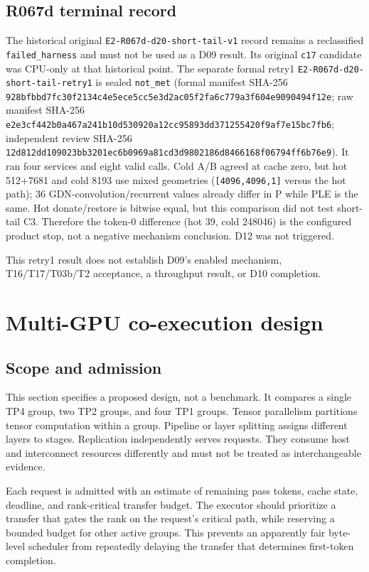 \documentclass[11pt]{article}
\begin{document}
\subsection{R067d terminal record}
\label{sec:r067d}

The historical original \texttt{E2-R067d-d20-short-tail-v1} record remains a reclassified \texttt{failed\_harness} and must not be used as a D09 result. Its original \texttt{c17} candidate was CPU-only at that historical point. The separate formal retry1 \texttt{E2-R067d-d20-short-tail-retry1} is sealed \texttt{not\_met} (formal manifest SHA-256 \texttt{928bfbbd7fc30f2134c4e5ece5cc5e3d2ac05f2fa6c779a3f604e9090494f12e}; raw manifest SHA-256 \texttt{e2e3cf442b0a467a241b10d530920a12cc95893dd371255420f9af7e15bc7fb6}; independent review SHA-256 \texttt{12d812dd109023bb3201ec6b0969a81cd3d9802186d8466168f06794ff6b76e9}). It ran four services and eight valid calls. Cold A/B agreed at cache zero, but hot 512+7681 and cold 8193 use mixed geometries (\texttt{[4096,4096,1]} versus the hot path); 36 GDN-convolution/recurrent values already differ in P while PLE is the same. Hot donate/restore is bitwise equal, but this comparison did not test short-tail C3. Therefore the token-0 difference (hot 39, cold 248046) is the configured product stop, not a negative mechanism conclusion. D12 was not triggered.

This retry1 result does not establish D09's enabled mechanism, T16/T17/T03b/T2 acceptance, a throughput result, or D10 completion.

\section{Multi-GPU co-execution design}

\subsection{Scope and admission}

This section specifies a proposed design, not a benchmark. It compares a single TP4 group, two TP2 groups, and four TP1 groups. Tensor parallelism partitions tensor computation within a group. Pipeline or layer splitting assigns different layers to stages. Replication independently serves requests. They consume host and interconnect resources differently and must not be treated as interchangeable evidence.

Each request is admitted with an estimate of remaining pass tokens, cache state, deadline, and rank-critical transfer budget. The executor should prioritize a transfer that gates the rank on the request's critical path, while reserving a bounded budget for other active groups. This prevents an apparently fair byte-level scheduler from repeatedly delaying the transfer that determines first-token completion.
\end{document}
